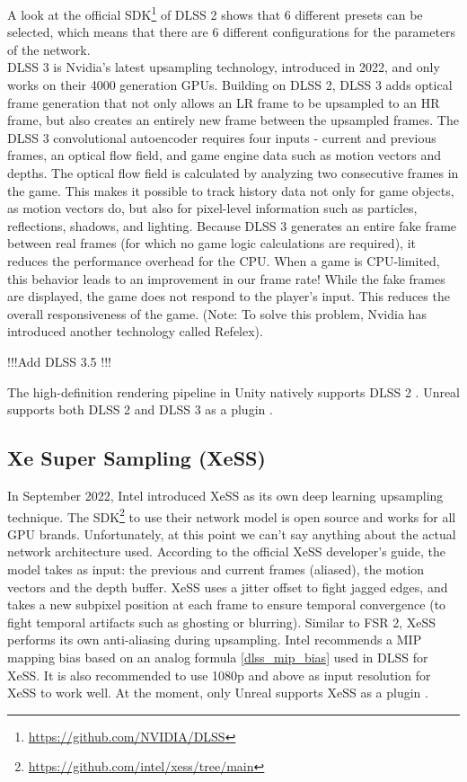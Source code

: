 \documentclass[letterpaper, 10 pt, conference]{ieeeconf}  %
\begin{document}
A look at the official SDK\footnote{\url{https://github.com/NVIDIA/DLSS}} of DLSS 2 shows that 6 different presets can be selected, which means that there are 6 different configurations for the parameters of the network. \\
DLSS 3 is Nvidia's latest upsampling technology, introduced in 2022, and only works on their 4000 generation GPUs.
Building on DLSS 2, DLSS 3 adds optical frame generation that not only allows an LR frame to be upsampled to an HR frame, but also creates an entirely new frame between the upsampled frames.
The DLSS 3 convolutional autoencoder requires four inputs - current and previous frames, an optical flow field, and game engine data such as motion vectors and depths.
The optical flow field is calculated by analyzing two consecutive frames in the game.
This makes it possible to track history data not only for game objects, as motion vectors do, but also for pixel-level information such as particles, reflections, shadows, and lighting.
Because DLSS 3 generates an entire fake frame between real frames (for which no game logic calculations are required), it reduces the performance overhead for the CPU.
When a game is CPU-limited, this behavior leads to an improvement in our frame rate!
While the fake frames are displayed, the game does not respond to the player's input.
This reduces the overall responsiveness of the game.
(Note: To solve this problem, Nvidia has introduced another technology called Refelex).

!!!Add DLSS 3.5 !!!

The high-definition rendering pipeline in Unity natively supports DLSS 2 \cite{dlss_unity}.
Unreal supports both DLSS 2 and DLSS 3 as a plugin \cite{dlss_unreal}.

\subsection{Xe Super Sampling (XeSS)}

In September 2022, Intel introduced XeSS as its own deep learning upsampling technique.
The SDK\footnote{\url{https://github.com/intel/xess/tree/main}} to use their network model is open source and works for all GPU brands.
Unfortunately, at this point we can't say anything about the actual network architecture used.
According to the official XeSS developer's guide, the model takes as input: the previous and current frames (aliased), the motion vectors and the depth buffer.
XeSS uses a jitter offset to fight jagged edges, and takes a new subpixel position at each frame to ensure temporal convergence (to fight temporal artifacts such as ghosting or blurring).
Similar to FSR 2, XeSS performs its own anti-aliasing during upsampling.
Intel recommends a MIP mapping bias based on an analog formula \ref{dlss_mip_bias} used in DLSS for XeSS.
It is also recommended to use 1080p and above as input resolution for XeSS to work well.
At the moment, only Unreal supports XeSS as a plugin \cite{xess_unreal}.
\end{document}
